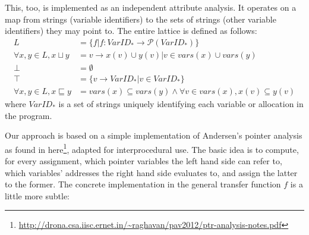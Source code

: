 \documentclass[a4paper,11pt]{article}
\begin{document}
This, too, is implemented as an independent attribute analysis. It operates on a map from strings (variable identifiers) to the sets of strings (other variable identifiers) they may point to. The entire lattice is defined as follows:
\begin{align*}
  L &= \{ f | f: \textbf{$VarID_*$} \rightarrow \mathcal{P}(\textbf{$VarID_*$}) \} \\
  \forall x, y \in L, x \sqcup y &= {v \rightarrow x(v) \cup y(v) | v \in vars(x) \cup vars(y) } \\
  \bot  &= \emptyset\\
  \top &= \{ v \rightarrow \textbf{$VarID_*$}| v \in \textbf{$VarID_*$}\} \\
  \forall x, y \in L, x \sqsubseteq y &= vars(x) \subseteq vars(y) \land \forall v \in vars(x), x(v) \subseteq y(v)
\end{align*}
\noindent where $VarID_*$ is a set of strings uniquely identifying each variable or allocation in the program.

Our approach is based on a simple implementation of Andersen's pointer analysis as found in here\footnote{\url{http://drona.csa.iisc.ernet.in/~raghavan/pav2012/ptr-analysis-notes.pdf}}, adapted for interprocedural use. The basic idea is to compute, for every assignment, which pointer variables the left hand side can refer to, which variables' addresses the right hand side evaluates to, and assign the latter to the former. The concrete implementation in the general transfer function $f$ is a little more subtle:
\end{document}
